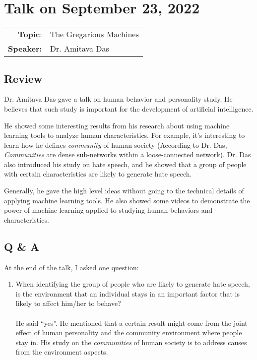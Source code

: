 \documentclass[11pt, oneside]{article}   	%
\begin{document}
\newpage
\section{Talk on September 23, 2022}
\begin{tabularx} {\textwidth}{r X}
\textbf{Topic}: & The Gregarious Machines\\
\textbf{Speaker:} & Dr. Amitava Das\\
\end{tabularx}

\subsection{Review}
Dr. Amitava Das gave a talk on human behavior and personality study. He believes that such study is important for the development of artificial intelligence. 

He showed some interesting results from his research about using machine learning tools to analyze human characteristics. For example, it's interesting to learn how he defines \textit{community} of human society (According to Dr. Das, \emph{Communities} are dense sub-networks within a loose-connected network). Dr. Das also introduced his study on hate speech, and he showed that a group of people with certain characteristics are likely to generate hate speech. 

Generally, he gave the high level ideas without going to the technical details of applying machine learning tools. He also showed some videos to demonstrate the power of machine learning applied to studying human behaviors and characteristics.

\subsection{Q \& A}
At the end of the talk, I asked one question: 
\begin{enumerate}
\item When identifying the group of people who are likely to generate hate speech, is the environment that an individual stays in an important factor that is likely to affect him/her to behave? \\ \\
He said ``yes''. He mentioned that a certain result might come from the joint effect of human personality and the community environment where people stay in. His study on the \textit{communities} of human society is to address causes from the environment aspects. 
\end{enumerate}
 
\end{document}
